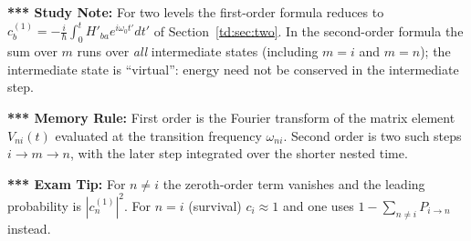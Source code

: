 \documentclass[11pt,a4paper]{article}
\begin{document}
\textbf{*** Study Note:} For two levels the first-order formula reduces to $c_b^{(1)}=-\frac i\hbar\int_0^tH'_{ba}e^{i\omega_0t'}dt'$ of Section~\ref{td:sec:two}. In the second-order formula the sum over $m$ runs over \textit{all} intermediate states (including $m=i$ and $m=n$); the intermediate state is ``virtual'': energy need not be conserved in the intermediate step.

\textbf{*** Memory Rule:} First order is the Fourier transform of the matrix element $V_{ni}(t)$ evaluated at the transition frequency $\omega_{ni}$. Second order is two such steps $i\to m\to n$, with the later step integrated over the shorter nested time.

\textbf{*** Exam Tip:} For $n\neq i$ the zeroth-order term vanishes and the leading probability is $|c_n^{(1)}|^2$. For $n=i$ (survival) $c_i\approx1$ and one uses $1-\sum_{n\neq i}P_{i\to n}$ instead.
\end{document}

